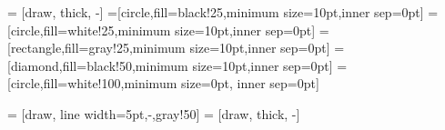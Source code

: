 

\def\sourceSink{{(0.75, 2.5)/s}, {(5, 3)/t}}
\def\blankNodes{{(1.3, 2.3)/a}, {(3, 1.5)/c}, {(5, 2.5)/f}, {(5.5, 1.5)/g}, {(5.6, 2.6)/i}}
\def\clusterHeads{{(2, 2)/CHb}, {(6.1, 2)/CHh}}
\def\gatewayNodes{{(3.7, 2)/Gd}, {(4.3, 2)/Ge}}

\def\radius{2cm}

\def\connect{s/a, a/CHb, CHb/c, c/Gd, Gd/Ge, Ge/f, f/g, g/CHh, CHh/i, i/t}


\setlength{\parskip}{5mm}

 = [draw, thick, -]
=[circle,fill=black!25,minimum size=10pt,inner sep=0pt]
=[circle,fill=white!25,minimum size=10pt,inner sep=0pt]
=[rectangle,fill=gray!25,minimum size=10pt,inner sep=0pt]
=[diamond,fill=black!50,minimum size=10pt,inner sep=0pt]
=[circle,fill=white!100,minimum size=0pt, inner sep=0pt]

 = [draw, line width=5pt,-,gray!50]
 = [draw, thick, -]

